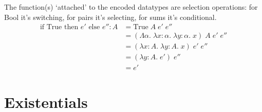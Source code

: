 \documentclass[a4paper,11pt]{article}
\begin{document}
{{        The function(s) `attached' to the encoded datatypes are selection operations: for Bool it's switching, for pairs
        it's selecting, for sums it's conditional.
        \begin{align*}
        \text{if True then }e'\text{ else } e'' : A &= \text{True}\;A\;e'\;e'' \\
                                    &= (\Lambda\alpha.\;\lambda x:\alpha.\;\lambda y:\alpha.\;x)\;A\;e'\;e'' \\
                                    &= (\lambda x:A.\;\lambda y:A.\;x)\;e'\;e'' \\
                                    &= (\lambda y:A.\;e')\;e'' \\
                                    &= e'
        \end{align*}
    }
}
\section{Existentials}
\end{document}
